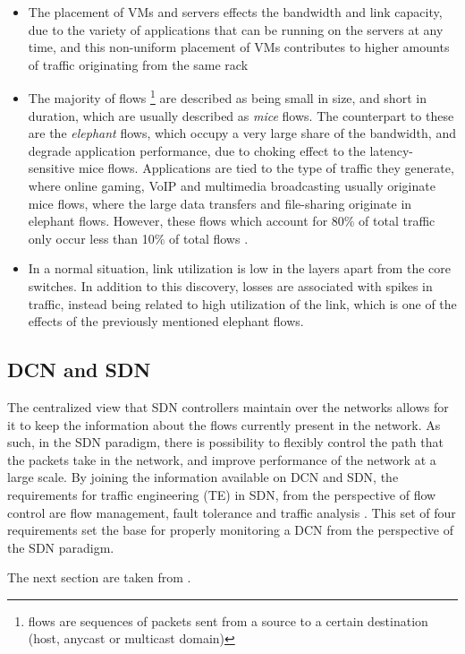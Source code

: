 \begin {itemize}
    \item The placement of VMs and servers effects the bandwidth and link capacity, due to the variety of applications that can be running on the servers at any time, and this non-uniform placement of VMs contributes to higher
        amounts of traffic originating from the same rack
    \item The majority of flows \footnote {flows are sequences of packets sent from a source to a certain destination (host, anycast or multicast domain)} are described as being small in size, and short in duration,
        which are usually described as \textit {mice} flows. 
        The counterpart to these are the \textit {elephant} flows, which occupy a very large share of the bandwidth, and degrade application performance, due to choking effect to the latency-sensitive mice flows. 
        Applications are tied to the type of traffic they generate, where online gaming, VoIP and multimedia broadcasting usually originate mice flows, where the large data transfers and file-sharing originate in elephant flows. 
        However, these flows which account for 80\% of total traffic only occur less than 10\% of total flows \cite {CITE - Broadcom Engineered Elephant flow for boosting ... }.
    \item In a normal situation, link utilization is low in the layers apart from the core switches. In addition to this discovery, losses are associated with spikes in traffic, instead being related to high utilization 
        of the link, which is one of the effects of the previously mentioned elephant flows.
\end {itemize}

\subsection {DCN and SDN}

\par The centralized view that SDN controllers maintain over the networks allows for it to keep the information about the flows currently present in the network. As such, in the SDN paradigm, there is possibility to flexibly control 
the path that the packets take in the network, and improve performance of the network at a large scale. By joining the information available on DCN and SDN, the requirements for traffic engineering (TE) in SDN, from
the perspective of flow control are flow management, fault tolerance and traffic analysis \cite { CITE - traffic_engineering_sdn}. This set of four requirements set the base for properly monitoring a DCN from the 
perspective of the SDN paradigm.
\par The next section are taken from \cite { CITE - traffic_engineering_sdn}.

